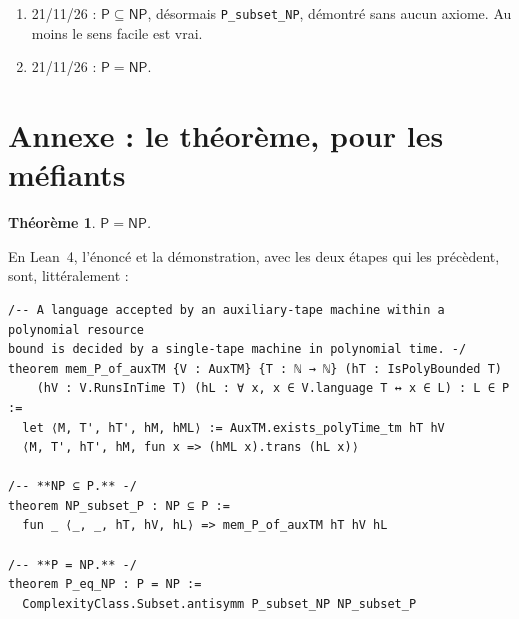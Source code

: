 \documentclass[11pt,a4paper]{amsart}
\newcommand{\NTeoremi}{2 299}
\newcommand{\NFile}{24}
\newtheorem{teorema}{Théorème}
\theoremstyle{remark}
\begin{document}
\begin{enumerate}
{        vjt-claude. Pas que le frigo.} la réécrit de zéro, en anglais et dans
        le style de Mathlib : \NFile{} fichiers, \NTeoremi{} théorèmes ; les
        noms italiens et la tactique \texttt{disagio} partent à la retraite.
        L'unique axiome devient le théorème de réduction des rubans de
        Hartmanis et Stearns~\cite{hs}, qui date de 1965 et n'a jamais fait de
        mal à personne.\footnote{Je l'avoue ici, en note, là où personne ne
        lit. Le théorème de 1965 dit qu'une machine à deux rubans se simule par
        une machine à un seul ruban, avec un ralentissement quadratique, et que
        les deux acceptent le même langage. Notre axiome dit exactement cela.
        Sauf que notre machine à deux rubans trouvait le certificat déjà écrit
        sur son second ruban, alors que celle à un seul ruban ne reçoit
        que~$x$ : pour accepter le même langage, le certificat, elle doit le
        trouver toute seule, en temps polynomial. Lu en vitesse, il passe pour
        un classique ; lu lentement, il dit $\mathsf{NP} \subseteq \mathsf{P}$.
        Il est planté au milieu d'un fichier d'une quarantaine de vrais lemmes
        sur le temps de la simulation, là où personne ne lit lentement. Sauf
        Lean, qui le nomme à chaque build.}
  \item 21/11/26 : $\mathsf{P} \subseteq \mathsf{NP}$, désormais
        \texttt{P\_subset\_NP}, démontré sans aucun axiome. Au moins le sens
        facile est vrai.
  \item 21/11/26 : $\mathsf{P} = \mathsf{NP}$.
\end{enumerate}

\appendix
\section*{Annexe : le théorème, pour les méfiants}

\begin{teorema}\label{thm:main}
$\mathsf{P} = \mathsf{NP}$.
\end{teorema}

En Lean~4, l'énoncé et la démonstration, avec les deux étapes qui les
précèdent, sont, littéralement :

\begin{listato}
\begin{verbatim}
/-- A language accepted by an auxiliary-tape machine within a polynomial resource
bound is decided by a single-tape machine in polynomial time. -/
theorem mem_P_of_auxTM {V : AuxTM} {T : ℕ → ℕ} (hT : IsPolyBounded T)
    (hV : V.RunsInTime T) (hL : ∀ x, x ∈ V.language T ↔ x ∈ L) : L ∈ P :=
  let ⟨M, T', hT', hM, hML⟩ := AuxTM.exists_polyTime_tm hT hV
  ⟨M, T', hT', hM, fun x => (hML x).trans (hL x)⟩

/-- **NP ⊆ P.** -/
theorem NP_subset_P : NP ⊆ P :=
  fun _ ⟨_, _, hT, hV, hL⟩ => mem_P_of_auxTM hT hV hL

/-- **P = NP.** -/
theorem P_eq_NP : P = NP :=
  ComplexityClass.Subset.antisymm P_subset_NP NP_subset_P
\end{verbatim}
\end{listato}
\end{document}
